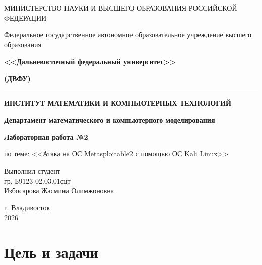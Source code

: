 \documentclass[a4paper,14pt]{extarticle}
\begin{document}
\begin{titlepage}
\begin{center}

\small
МИНИСТЕРСТВО НАУКИ И ВЫСШЕГО ОБРАЗОВАНИЯ РОССИЙСКОЙ ФЕДЕРАЦИИ

\smallskip
Федеральное государственное автономное образовательное учреждение высшего образования

\smallskip
\textbf{<<Дальневосточный федеральный университет>>}

\textbf{(ДВФУ)}

\vspace{5mm}
\noindent\rule{\textwidth}{2pt}

\vspace{10mm}
{\large\textbf{ИНСТИТУТ МАТЕМАТИКИ И КОМПЬЮТЕРНЫХ ТЕХНОЛОГИЙ}}



\vspace{5mm}
\textbf{Департамент математического и компьютерного моделирования}

\vspace{15mm}
{\large\textbf{Лабораторная работа №2}}

\vspace{5mm}
по теме: <<Атака на ОС Metasploitable2 с помощью ОС Kali Linux>>

\end{center}

\vspace{30mm}

\begin{flushright}
Выполнил студент\\
гр. Б9123-02.03.01сцт\\
Избосарова Жасмина Олимжоновна
\end{flushright}

\vfill

\begin{center}
г. Владивосток\\
2026
\end{center}

\end{titlepage}

\tableofcontents
\newpage

\section*{Цель и задачи}
\end{document}

